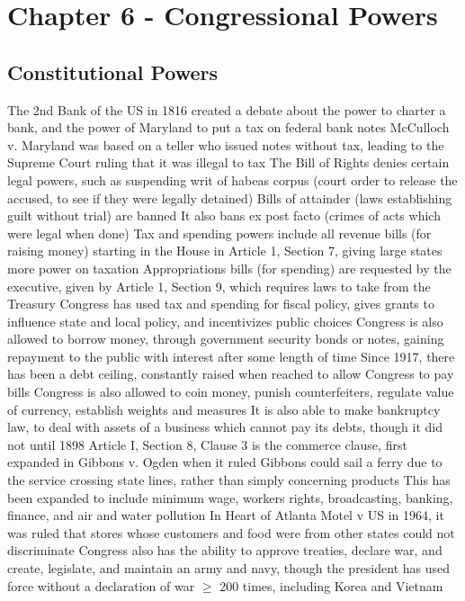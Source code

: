 \documentclass[11 pt, twoside]{article}
\newenvironment{outline*}
{
	\begin{outline}[enumerate]
	}
	{\end{outline}
}
\begin{document}
\section{Chapter 6 - Congressional Powers}
\subsection{Constitutional Powers}
\begin{outline*}
\1 The 2nd Bank of the US in 1816 created a debate about the power to charter a bank, and the power of Maryland to put a tax on federal bank notes
\2 McCulloch v. Maryland was based on a teller who issued notes without tax, leading to the Supreme Court ruling that it was illegal to tax
\1 The Bill of Rights denies certain legal powers, such as suspending writ of habeas corpus (court order to release the accused, to see if they were legally detained)
\2 Bills of attainder (laws establishing guilt without trial) are banned
\2 It also bans ex post facto (crimes of acts which were legal when done)
\1 Tax and spending powers include all revenue bills (for raising money) starting in the House in Article 1, Section 7, giving large states more power on taxation
\2 Appropriations bills (for spending) are requested by the executive, given by Article 1, Section 9, which requires laws to take from the Treasury
\2 Congress has used tax and spending for fiscal policy, gives grants to influence state and local policy, and incentivizes public choices
\1 Congress is also allowed to borrow money, through government security bonds or notes, gaining repayment to the public with interest after some length of time
\2 Since 1917, there has been a debt ceiling, constantly raised when reached to allow Congress to pay bills
\2 Congress is also allowed to coin money, punish counterfeiters, regulate value of currency, establish weights and measures
\2 It is also able to make bankruptcy law, to deal with assets of a business which cannot pay its debts, though it did not until 1898
\1 Article I, Section 8, Clause 3 is the commerce clause, first expanded in Gibbons v. Ogden when it ruled Gibbons could sail a ferry due to the service crossing state lines, rather than simply concerning products
\2 This has been expanded to include minimum wage, workers rights, broadcasting, banking, finance, and air and water pollution
\2 In Heart of Atlanta Motel v US in 1964, it was ruled that stores whose customers and food were from other states could not discriminate
\1 Congress also has the ability to approve treaties, declare war, and create, legislate, and maintain an army and navy, though the president has used force without a declaration of war $\geq$ 200 times, including Korea and Vietnam

\end{outline*}
\end{document}
